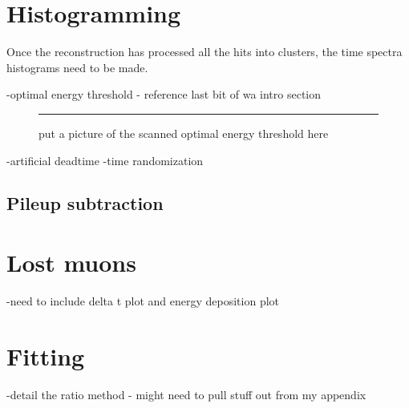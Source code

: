 \section{Histogramming}
\label{sec:Histogramming}


Once the reconstruction has processed all the hits into clusters, the time spectra histograms need to be made.


-optimal energy threshold - reference last bit of wa intro section

\begin{figure}[]
    \centering
    \rule{10cm}{10cm}
    \caption[put caption here]{put a picture of the scanned optimal energy threshold here}
    \label{fig:OptimalEnergyThreshold}
\end{figure}




-artificial deadtime
-time randomization





\subsection{Pileup subtraction}
\label{sub:pileupsubtraction}


\section{Lost muons}
\label{sec:lostmuons}

-need to include delta t plot and energy deposition plot


\cite{lostmuons}




\section{Fitting}
\label{sec:Fitting}


-detail the ratio method - might need to pull stuff out from my appendix


